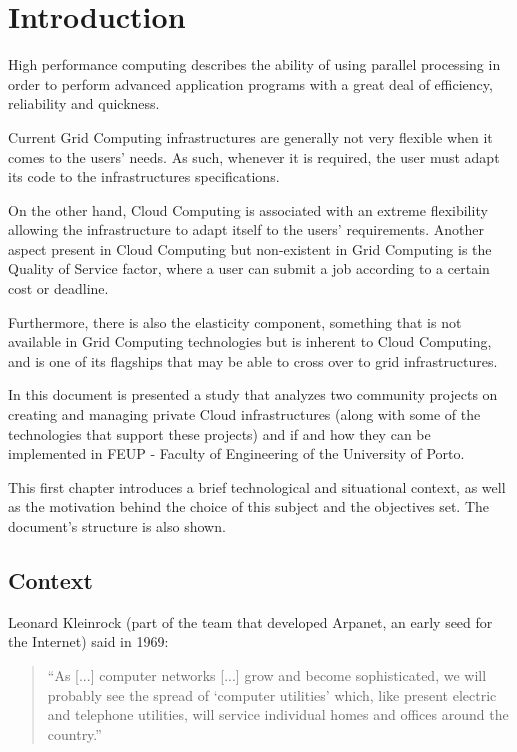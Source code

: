 \chapter{Introduction} \label{chap:intro}


High performance computing describes the ability of using parallel processing in order to perform advanced application programs with a great deal of efficiency, reliability and quickness. \cite{hpclinux}

Current Grid Computing infrastructures are generally not very flexible when it comes to the users' needs. As such, whenever it is required, the user must adapt its code to the infrastructures specifications.

On the other hand, Cloud Computing is associated with an extreme flexibility allowing the infrastructure to adapt itself to the users' requirements. Another aspect present in Cloud Computing but non-existent in Grid Computing is the Quality of Service factor, where a user can submit a job according to a certain cost or deadline.

Furthermore, there is also the elasticity component, something that is not available in Grid Computing technologies but is inherent to Cloud Computing, and is one of its flagships that may be able to cross over to grid infrastructures.

In this document is presented a study that analyzes two community projects on creating and managing private Cloud infrastructures (along with some of the technologies that support these projects) and if and how they can be implemented in FEUP - Faculty of Engineering of the University of Porto.

This first chapter introduces a brief technological and situational context, as well as the motivation behind the choice of this subject and the objectives set. The document's structure is also shown.

\section{Context} \label{sec:context}

Leonard Kleinrock (part of the team that developed Arpanet, an early seed for the Internet) said in 1969:

\begin{quote}
  ``As [...] computer networks [...] grow and become sophisticated, we will probably see the spread of `computer utilities' which, like present electric and telephone utilities, will service individual homes and offices around the country.''~\cite{Buyya2009599} 
\end{quote}
	
